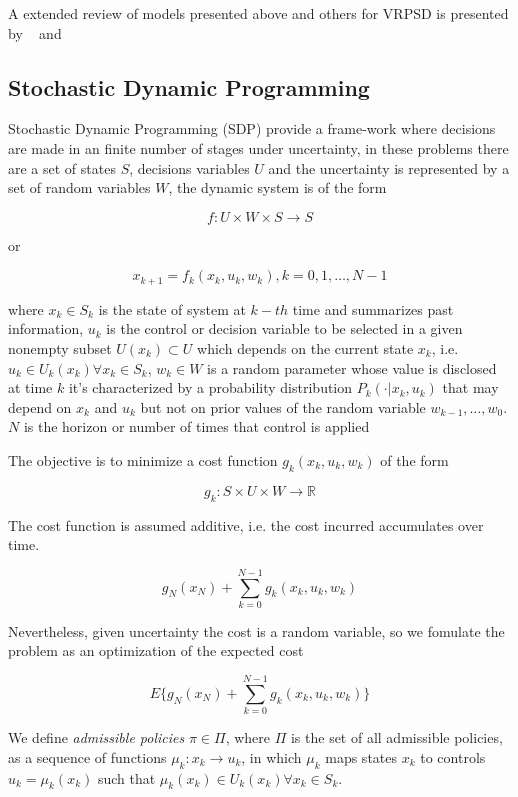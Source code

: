 A extended review of models presented above and others for VRPSD is presented by ~\cite{Dror_2005} and ~\cite{Dror1993432}

\subsection{Stochastic Dynamic Programming}

Stochastic Dynamic Programming (SDP) provide a frame-work where decisions are made in an finite number of stages under uncertainty, in these problems there are a set of states $S$, decisions variables $U$ and the uncertainty is represented by a set of random variables $W$, the dynamic system is of the form

\[f: U\times W \times S \rightarrow S\]

 or

\begin{equation}\label{eq:system_dynamic_decisions}
x_{k+1}=f_k(x_k,u_k,w_k), k=0,1,\ldots,N-1 
\end{equation}


where $x_k \in S_k$ is the state of system at $k-th$ time and summarizes past information, $u_k$ is the control or decision variable to be selected in a given nonempty subset $U(x_k) \subset U$ which depends on the current state $x_k$, i.e. $u_k \in U_k(x_k) \forall x_k \in S_k$, $w_k \in W$ is a random parameter whose value is disclosed at time $k$ it's characterized by a probability distribution $P_k(\cdot|x_k,u_k)$ that may depend on $x_k$ and $u_k$ but not on prior values of the random variable $w_{k-1},\ldots,w_0$. $N$ is the horizon or number of times that control is applied

The objective is to minimize a cost function $g_k(x_k,u_k,w_k)$ of the form

\[g_k:S\times U \times W \rightarrow \mathbb{R}\]

The cost function is assumed additive, i.e. the cost incurred accumulates over time.

\[g_N(x_N)+\sum_{k=0}^{N-1}g_k(x_k,u_k,w_k)\]

Nevertheless, given uncertainty the cost is a random variable, so we fomulate the problem as an optimization of the expected cost 

\begin{equation}\label{eq:SDP_expected_cost}
 E\biggr\{g_N(x_N)+\sum_{k=0}^{N-1}g_k(x_k,u_k,w_k)\biggr\}
\end{equation}

We define \textit{admissible policies} $\pi \in \Pi$, where $\Pi$ is the set of all admissible policies, as a sequence of functions $\mu_k:x_k\rightarrow u_k$, in which $\mu_k$ maps states $x_k$ to controls $u_k=\mu_k(x_k)$ such that $\mu_k(x_k) \in U_k(x_k) \forall x_k \in S_k$.

